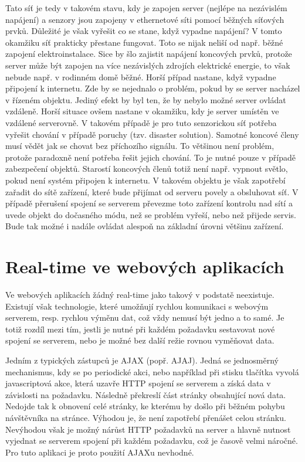 Tato síť je tedy v takovém stavu, kdy je zapojen server (nejlépe na nezávislém napájení) a senzory jsou zapojeny v ethernetové síti pomocí běž\-ných síťových prvků. Důležité je však vyřešit co se stane, když vypadne napájení? V tomto okamžiku síť prakticky přestane fungovat. Toto se nijak neliší od např. běžné zapojení elektroinstalace. Sice by šlo zajistit napájení koncových prvků, protože server může být zapojen na více nezávislých zdro\-jích elektrické energie, to však nebude např. v rodinném domě běžné. Horší případ nastane, když vypadne připojení k internetu. Zde by se nejednalo o problém, pokud by se server nacházel v řízeném objektu. Jediný efekt by byl ten, že by nebylo možné server ovládat vzdáleně. Horší situace ovšem nastane v okamžiku, kdy je server umístěn ve vzdálené serverovně. V takovém případě je pro tuto senzorickou síť potřeba vyřešit chování v případě poruchy (tzv. disaster solution). Samotné koncové členy musí vědět jak se chovat bez příchozího signálu. To většinou není problém, protože paradoxně není potřeba řešit jejich chování. To je nutné pouze v případě zabezpečení objektů. Starostí koncových členů totiž není např. vypnout světlo, pokud není systém připojen k internetu. V takovém objektu je však zapotřebí zařadit do sítě zařízení, které bude přijímat od serveru povely a obsluhovat síť. V případě přerušení spojení se serverem převezme toto zařízení kontrolu nad sítí a uvede objekt do dočasného módu, než se problém vyřeší, nebo než přijede servis. Bude tak možné i nadále ovládat alespoň na základní úrovni většinu zařízení.

\section{Real-time ve webových aplikacích}
Ve webových aplikacích žádný real-time  jako takový v podstatě neexistuje. Existují však technologie, které umožňují rychlou komunikaci s webovým serverem, resp. rychlou výměnu dat, což vždy nemusí být jedno a to samé. Je totiž rozdíl mezi tím, jestli je nutné při každém požadavku sestavovat nové spojení se serverem, nebo je možné bez další režie rovnou vyměňovat data.

Jedním z typických zástupců je AJAX (popř. AJAJ). Jedná se jed\-no\-směr\-ný mechanismus, kdy se po periodické akci, nebo například při stisku tlačítka vyvolá javascriptová akce, která uzavře HTTP spojení se serverem a získá data v závislosti na požadavku. Následně překreslí část stránky obsahující nová data. Nedojde tak k obnovení celé stránky, ke kterému by došlo při běžném pohybu návštěvníka na stránce. Výhodou je, že není zapotřebí přenášet celou stránku. Nevýhodou však je možný nárůst HTTP požadavků na server a hlavně nutnost vyjednat se serverem spojení při každém po\-ža\-dav\-ku, což je časově velmi náročné. Pro tuto aplikaci je proto použití AJAXu nevhodné. 

